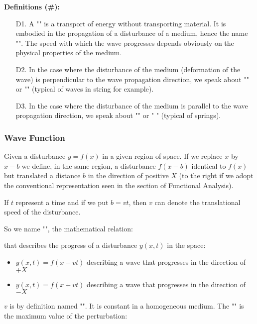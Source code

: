 	\textbf{Definitions (\#\mydef):}
	\begin{enumerate}
		\item[D1.] A "" is a transport of energy without transporting material. It is embodied in the propagation of a disturbance of a medium, hence the name "". The speed with which the wave progresses depends obviously on the physical properties of the medium.
		
		\item[D2.] In the case where the disturbance of the medium (deformation of the wave) is perpendicular to the wave propagation direction, we speak about "" or "" (typical of waves in string for example).
		\item[D3.] In the case where the disturbance of the medium is parallel to the wave propagation direction, we speak about "" or " " (typical of springs).
	\end{enumerate}
	
	\subsubsection{Wave Function}
	Given a disturbance $y=f(x)$ in a given region of space. If we replace $x$ by $x-b$ we define, in the same region, a disturbance $f (x-b)$ identical to $f (x)$ but translated a distance $b$ in the direction of positive $X$ (to the right if we adopt the conventional representation seen in the section of Functional Analysis).
	
	If $t$ represent a time and if we put $b=vt$, then $v$ can denote the translational speed of the disturbance.
	
	So we name "", the mathematical relation:
	
	that describes the progress of a disturbance $y (x, t)$ in the space:
	\begin{itemize}
		\item $y(x,t)=f(x-vt)$ describing a wave that progresses in the direction of $+X$
		\item $y(x,t)=f(x+vt)$ describing a wave that progresses in the direction of $-X$
	\end{itemize}
	$v$ is by definition named "". It is constant in a homogeneous medium. The  "" is the maximum value of the perturbation:
	
